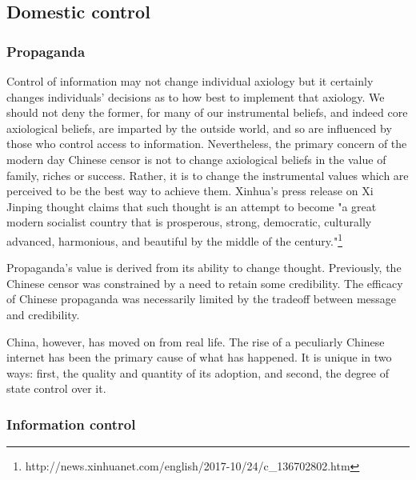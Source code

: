 \documentclass[11pt,a4paper]{report}
\newcounter{count}
\begin{document}
\subsection{Domestic control}\label{domestic-control}

\subsubsection{Propaganda}\label{propaganda}

\begin{multicols}{2}
	
Control of information may not change individual axiology but it
certainly changes individuals' decisions as to how best to implement
that axiology. We should not deny the former, for many of our
instrumental beliefs, and indeed core axiological beliefs, are imparted
by the outside world, and so are influenced by those who control access
to information. Nevertheless, the primary concern of the modern day
Chinese censor is not to change axiological beliefs in the value of
family, riches or success. Rather, it is to change the instrumental
values which are perceived to be the best way to achieve them. Xinhua's
press release on Xi Jinping thought claims that such thought is an
attempt to become "a great modern socialist country that is prosperous,
strong, democratic, culturally advanced, harmonious, and beautiful by
the middle of the century."\footnote{http://news.xinhuanet.com/english/2017-10/24/c\_136702802.htm}

Propaganda's value is derived from its ability to change thought.
Previously, the Chinese censor was constrained by a need to retain some
credibility. The efficacy of Chinese propaganda was necessarily limited
by the tradeoff between message and credibility.

China, however, has moved on from real life. The rise of a peculiarly
Chinese internet has been the primary cause of what has happened. It is
unique in two ways: first, the quality and quantity of its adoption, and
second, the degree of state control over it.

\end{multicols}

\subsubsection{Information control}\label{information-control}
\end{document}
